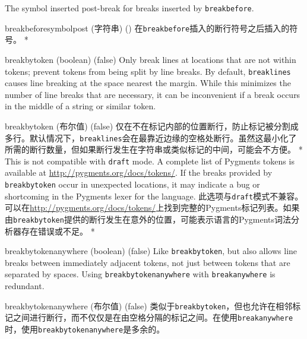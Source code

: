 \begin{paracol}{2}
\begin{optionlist}
    The symbol inserted post-break for breaks inserted by \texttt{breakbefore}.
    \switchcolumn
    \item[breakbeforesymbolpost (字符串) (\meta{none})]
    在\texttt{breakbefore}插入的断行符号之后插入的符号。
    \switchcolumn[0]*%
  \item[breakbytoken (boolean) (false)]
  Only break lines at locations that are not within tokens; prevent tokens from being split by line breaks.  By default, \texttt{breaklines} causes line breaking at the space nearest the margin.  While this minimizes the number of line breaks that are necessary, it can be inconvenient if a break occurs in the middle of a string or similar token.
  \switchcolumn
  \item[breakbytoken (布尔值) (false)]
  仅在不在标记内部的位置断行，防止标记被分割成多行。默认情况下，\texttt{breaklines}会在最靠近边缘的空格处断行。虽然这最小化了所需的断行数量，但如果断行发生在字符串或类似标记的中间，可能会不方便。
  \switchcolumn[0]*%
  This is not compatible with \texttt{draft} mode.  A complete list of Pygments tokens is available at \url{http://pygments.org/docs/tokens/}.  If the breaks provided by \texttt{breakbytoken} occur in unexpected locations, it may indicate a bug or shortcoming in the Pygments lexer for the language.
  \switchcolumn
  此选项与\texttt{draft}模式不兼容。可以在\url{http://pygments.org/docs/tokens/}上找到完整的Pygments标记列表。如果由\texttt{breakbytoken}提供的断行发生在意外的位置，可能表示语言的Pygments词法分析器存在错误或不足。
  \switchcolumn[0]*%
  \item[breakbytokenanywhere (boolean) (false)] 
  Like \texttt{breakbytoken}, but also allows line breaks between immediately adjacent tokens, not just between tokens that are separated by spaces.  Using \texttt{breakbytokenanywhere} with \texttt{breakanywhere} is redundant.
  \switchcolumn
  \item[breakbytokenanywhere (布尔值) (false)] 
  类似于\texttt{breakbytoken}，但也允许在相邻标记之间进行断行，而不仅仅是在由空格分隔的标记之间。在使用\texttt{breakanywhere}时，使用\texttt{breakbytokenanywhere}是多余的。

\end{optionlist}
\end{paracol}
